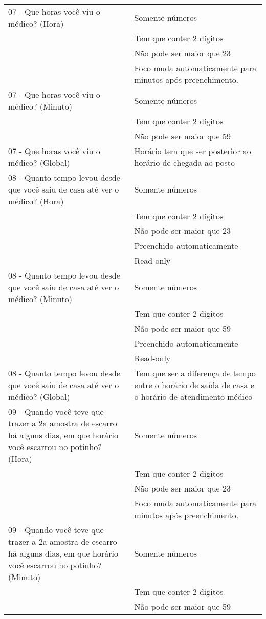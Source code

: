 \begin{longtable}{p{}|p{}}
07 - Que horas você viu o médico? (Hora) & Somente números \\ \cline{2-2}  & Tem que conter 2 dígitos \\ \cline{2-2} & Não pode ser maior que 23 \\ \cline{2-2} & Foco muda automaticamente para minutos após preenchimento.  \\ \hline
07 - Que horas você viu o médico? (Minuto) & Somente números \\ \cline{2-2}  & Tem que conter 2 dígitos \\ \cline{2-2} & Não pode ser maior que 59 \\ \hline
07 - Que horas você viu o médico? (Global) & Horário tem que ser posterior ao horário de chegada ao posto \\ \hline

08 - Quanto tempo levou desde que você saiu de casa até ver o médico? (Hora) & Somente números \\ \cline{2-2}  & Tem que conter 2 dígitos \\ \cline{2-2} & Não pode ser maior que 23 \\ \cline{2-2} & Preenchido automaticamente  \\ \cline{2-2} & Read-only \\ \hline
08 - Quanto tempo levou desde que você saiu de casa até ver o médico? (Minuto) & Somente números \\ \cline{2-2}  & Tem que conter 2 dígitos \\ \cline{2-2} & Não pode ser maior que 59 \\ \cline{2-2} & Preenchido automaticamente  \\ \cline{2-2} & Read-only \\ \hline 
08 - Quanto tempo levou desde que você saiu de casa até ver o médico? (Global) & Tem que ser a diferença de tempo entre o horário de saída de casa e o horário de atendimento médico \\ \hline 

09 - Quando você teve que trazer a 2a amostra de escarro há alguns dias, em que horário você escarrou no potinho? (Hora) & Somente números \\ \cline{2-2}  & Tem que conter 2 dígitos \\ \cline{2-2} & Não pode ser maior que 23 \\ \cline{2-2} & Foco muda automaticamente para minutos após preenchimento.  \\ \hline
09 - Quando você teve que trazer a 2a amostra de escarro há alguns dias, em que horário você escarrou no potinho? (Minuto) & Somente números \\ \cline{2-2}  & Tem que conter 2 dígitos \\ \cline{2-2} & Não pode ser maior que 59 \\ \hline


\end{longtable}
